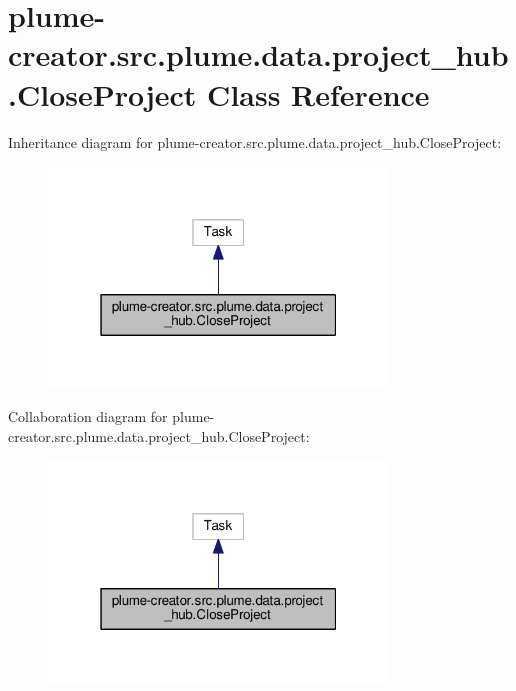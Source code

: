 \hypertarget{classplume-creator_1_1src_1_1plume_1_1data_1_1project__hub_1_1_close_project}{}\section{plume-\/creator.src.\+plume.\+data.\+project\+\_\+hub.\+Close\+Project Class Reference}
\label{classplume-creator_1_1src_1_1plume_1_1data_1_1project__hub_1_1_close_project}


Inheritance diagram for plume-\/creator.src.\+plume.\+data.\+project\+\_\+hub.\+Close\+Project\+:\nopagebreak
\begin{figure}[H]
\begin{center}
\leavevmode
\includegraphics[width=256pt]{classplume-creator_1_1src_1_1plume_1_1data_1_1project__hub_1_1_close_project__inherit__graph}
\end{center}
\end{figure}


Collaboration diagram for plume-\/creator.src.\+plume.\+data.\+project\+\_\+hub.\+Close\+Project\+:\nopagebreak
\begin{figure}[H]
\begin{center}
\leavevmode
\includegraphics[width=256pt]{classplume-creator_1_1src_1_1plume_1_1data_1_1project__hub_1_1_close_project__coll__graph}
\end{center}
\end{figure}
